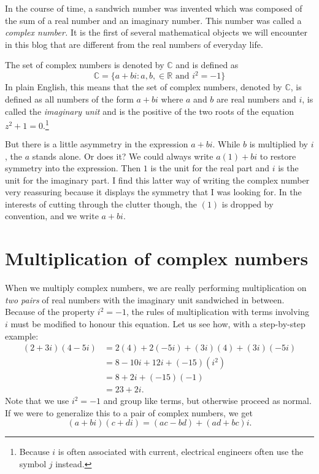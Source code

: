 \documentclass[
  a4paper,
]{article}
\begin{document}
In the course of time, a sandwich number was invented which was composed
of the sum of a real number and an imaginary number. This number was
called a \emph{complex number.} It is the first of several mathematical
objects we will encounter in this blog that are different from the real
numbers of everyday life.

The set of complex numbers is denoted by \(\mathbb{C}\) and is defined
as \[
\mathbb{C} = \{a+bi: a, b, \in \mathbb{R} \mbox{ and } i^2 = -1\}
\] In plain English, this means that the set of complex numbers, denoted
by \(\mathbb{C}\), is defined as all numbers of the form \(a + bi\)
where \(a\) and \(b\) are real numbers and \(i\), is called the
\emph{imaginary unit} and is the positive of the two roots of the
equation \(z^2 + 1 = 0.\)\footnote{Because \(i\) is often associated
  with current, electrical engineers often use the symbol \(j\) instead.}

But there is a little asymmetry in the expression \(a + bi\). While
\(b\) is multiplied by \(i\), the \(a\) stands alone. Or does it? We
could always write \(a(1) + bi\) to restore symmetry into the
expression. Then \(1\) is the unit for the real part and \(i\) is the
unit for the imaginary part. I find this latter way of writing the
complex number very reassuring because it displays the symmetry that I
was looking for. In the interests of cutting through the clutter though,
the \((1)\) is dropped by convention, and we write \(a + bi\).

\hypertarget{multiplication-of-complex-numbers}{%
\section{Multiplication of complex
numbers}\label{multiplication-of-complex-numbers}}

When we multiply complex numbers, we are really performing
multiplication on \emph{two pairs} of real numbers with the imaginary
unit sandwiched in between. Because of the property \(i^2 = -1\), the
rules of multiplication with terms involving \(i\) must be modified to
honour this equation. Let us see how, with a step-by-step example: \[
\begin{aligned}
(2 + 3i)(4 - 5i) & = 2(4) + 2(-5i) + (3i)(4) + (3i)(-5i)\\
& = 8 - 10i + 12i + (-15)(i^2)\\
& = 8 + 2i + (-15)(-1)\\
& = 23 + 2i.
\end{aligned}
\] Note that we use \(i^2 = -1\) and group like terms, but otherwise
proceed as normal. If we were to generalize this to a pair of complex
numbers, we get \[(a + bi)(c + di) = (ac - bd) + (ad + bc)i.\]
\end{document}
